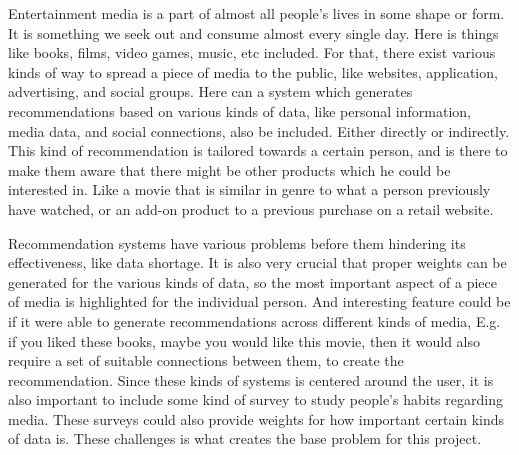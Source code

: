 Entertainment media is a part of almost all people’s lives in some shape or form. It is something we seek out and consume almost every single day. Here is things like books, films, video games, music, etc included. For that, there exist various kinds of way to spread a piece of media to the public, like websites, application, advertising, and social groups. Here can a system which generates recommendations based on various kinds of data, like personal information, media data, and social connections, also be included. Either directly or indirectly. This kind of recommendation is tailored towards a certain person, and is there to make them aware that there might be other products which he could be interested in. Like a movie that is similar in genre to what a person previously have watched, or an add-on product to a previous purchase on a retail website.

Recommendation systems have various problems before them hindering its effectiveness, like data shortage. It is also very crucial that proper weights can be generated for the various kinds of data, so the most important aspect of a piece of media is highlighted for the individual person. And interesting feature could be if it were able to generate recommendations across different kinds of media, E.g. if you liked these books, maybe you would like this movie, then it would also require a set of suitable connections between them, to create the recommendation. Since these kinds of systems is centered around the user, it is also important to include some kind of survey to study people's habits regarding media. These surveys could also provide weights for how important certain kinds of data is. These challenges is what creates the base problem for this project.